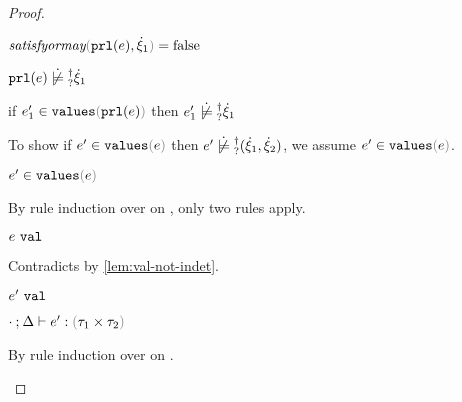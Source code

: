 \begin{proof}
\begin{byCases}
\begin{byCases}
\begin{byCases}
\begin{byCases}
          \item[\false] 
          \begin{pfsteps*}
          \item $\fsatisfyormay{\hprl{e}}{\hxi_1}=\false$  
          \item $\cnotsatisfyormay{\hprl{e}}{\hxi_1}$  
          \item if $\inValues{e_1'}{\hprl{e}}$ then $\cnotsatisfyormay{e_1'}{\hxi_1}$  
          \end{pfsteps*} 
          To show if $\inValues{e'}{e}$ then $\cnotsatisfyormay{e'}{\cpair{\hxi_1}{\hxi_2}}$, we assume $\inValues{e'}{e}$.
          \begin{pfsteps*}
          \item $\inValues{e'}{e}$  
          \end{pfsteps*}
          By rule induction over  on , only two rules apply.
          \begin{byCases}
            \item[\text{(\ref{rule:IVVal})}]
            \begin{pfsteps*}
            \item $e ~\mathtt{val}$ 
            \end{pfsteps*} 
            Contradicts  by \autoref{lem:val-not-indet}.
            \item[\text{(\ref{rule:IVIndet})}] 
            \begin{pfsteps*}
            \item $e' ~\mathtt{val}$  
            \item $\hexptyp{\cdot}{\Delta}{e'}{\tprod{\tau_1}{\tau_2}}$  
            \end{pfsteps*}
            By rule induction over  on .
            \begin{byCases}
              \item[\text{(\ref{rule:VNum})}]
              \begin{pfsteps*}

\end{pfsteps*}
\end{byCases}
\end{byCases}
\end{byCases}
\end{byCases}
\end{byCases}
\end{byCases}
\end{proof}

